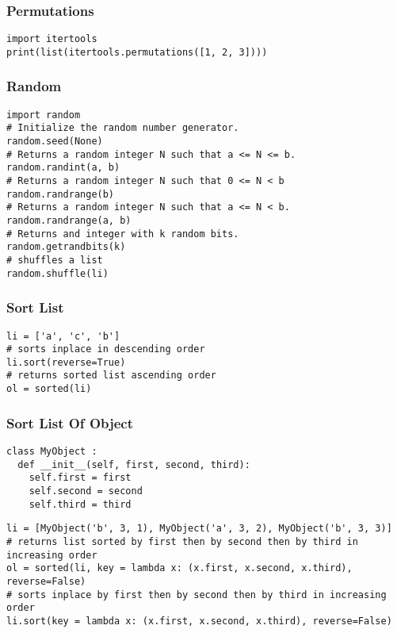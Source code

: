\documentclass[twoside]{article}
\begin{document}
\begin{multicols*}{2}
\begin{verbatim}
\end{verbatim}

\subsubsectionfont{\large\bfseries\sffamily\underline}
\subsubsection*{Permutations}
\begin{verbatim}
import itertools
print(list(itertools.permutations([1, 2, 3])))

\end{verbatim}

\subsubsectionfont{\large\bfseries\sffamily\underline}
\subsubsection*{Random}
\begin{verbatim}
import random
# Initialize the random number generator.
random.seed(None)
# Returns a random integer N such that a <= N <= b.
random.randint(a, b)
# Returns a random integer N such that 0 <= N < b
random.randrange(b)
# Returns a random integer N such that a <= N < b.
random.randrange(a, b)
# Returns and integer with k random bits.
random.getrandbits(k)
# shuffles a list
random.shuffle(li)
\end{verbatim}

\subsubsectionfont{\large\bfseries\sffamily\underline}
\subsubsection*{Sort List}
\begin{verbatim}
li = ['a', 'c', 'b']
# sorts inplace in descending order
li.sort(reverse=True)
# returns sorted list ascending order
ol = sorted(li)
\end{verbatim}

\subsubsectionfont{\large\bfseries\sffamily\underline}
\subsubsection*{Sort List Of Object}
\begin{verbatim}
class MyObject :
  def __init__(self, first, second, third):
    self.first = first
    self.second = second
    self.third = third
\end{verbatim}
\vspace{-12pt}
\begin{verbatim}
li = [MyObject('b', 3, 1), MyObject('a', 3, 2), MyObject('b', 3, 3)]
# returns list sorted by first then by second then by third in increasing order
ol = sorted(li, key = lambda x: (x.first, x.second, x.third), reverse=False)
# sorts inplace by first then by second then by third in increasing order
li.sort(key = lambda x: (x.first, x.second, x.third), reverse=False)


\end{verbatim}
\end{multicols*}
\end{document}
